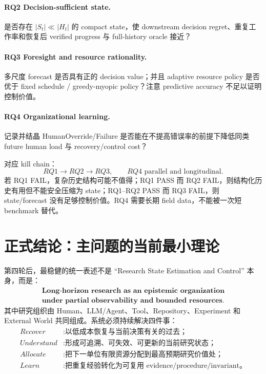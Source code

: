\documentclass[11pt,a4paper]{ctexart}
\begin{document}
\paragraph{RQ2 Decision-sufficient state.}
是否存在 $|S_t|\ll|H_t|$ 的 compact state，使 downstream decision regret、重复工作率和恢复后 verified progress 与 full-history oracle 接近？

\paragraph{RQ3 Foresight and resource rationality.}
多尺度 forecast 是否具有正的 decision value；并且 adaptive resource policy 是否优于 fixed schedule / greedy-myopic policy？注意 predictive accuracy 不足以证明控制价值。

\paragraph{RQ4 Organizational learning.}
记录并结晶 HumanOverride/Failure 是否能在不提高错误率的前提下降低同类 future human load 与 recovery/control cost？

对应 kill chain：
\begin{equation}
\boxed{RQ1\to RQ2\to RQ3,\qquad RQ4\text{ parallel and longitudinal}.}
\end{equation}
若 RQ1 FAIL，复杂历史结构可能不值得；RQ1 PASS 而 RQ2 FAIL，则结构化历史有用但不能安全压缩为 state；RQ1--RQ2 PASS 而 RQ3 FAIL，则 state/forecast 没有足够控制价值。RQ4 需要长期 field data，不能被一次短 benchmark 替代。

\section{正式结论：主问题的当前最小理论}

第四轮后，最稳健的统一表述不是 ``Research State Estimation and Control'' 本身，而是：
\begin{equation}
\boxed{\begin{gathered}
\textbf{Long-horizon research as an epistemic organization}\\
\textbf{under partial observability and bounded resources.}
\end{gathered}}
\end{equation}
其中研究组织由 Human、LLM/Agent、Tool、Repository、Experiment 和 External World 共同组成。系统必须持续解决四件事：
\begin{equation}
\boxed{
\begin{aligned}
Recover &: \text{以低成本恢复与当前决策有关的过去；}\\
Understand &: \text{形成可追溯、可失效、可更新的当前研究状态；}\\
Allocate &: \text{把下一单位有限资源分配到最高预期研究价值处；}\\
Learn &: \text{把重复经验转化为可复用 evidence/procedure/invariant。}
\end{aligned}}
\end{equation}
\end{document}
